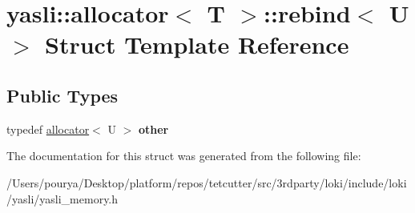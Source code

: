 \hypertarget{structyasli_1_1allocator_1_1rebind}{}\section{yasli\+:\+:allocator$<$ T $>$\+:\+:rebind$<$ U $>$ Struct Template Reference}
\label{structyasli_1_1allocator_1_1rebind}
\subsection*{Public Types}
\begin{DoxyCompactItemize}
\item 
\hypertarget{structyasli_1_1allocator_1_1rebind_a8799eb0a9b12c51e3e598dd2b558b8ee}{}typedef \hyperlink{classyasli_1_1allocator}{allocator}$<$ U $>$ {\bfseries other}\label{structyasli_1_1allocator_1_1rebind_a8799eb0a9b12c51e3e598dd2b558b8ee}

\end{DoxyCompactItemize}


The documentation for this struct was generated from the following file\+:\begin{DoxyCompactItemize}
\item 
/\+Users/pourya/\+Desktop/platform/repos/tetcutter/src/3rdparty/loki/include/loki/yasli/yasli\+\_\+memory.\+h\end{DoxyCompactItemize}
